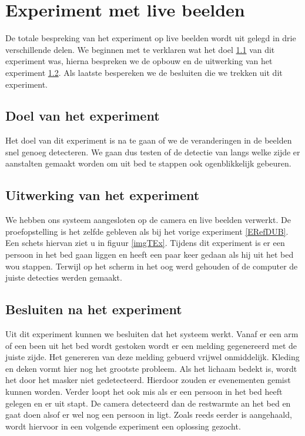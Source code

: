 \section{Experiment met live beelden}
\label{ERefELB}
De totale bespreking van het experiment op live beelden wordt uit gelegd in drie verschillende delen. We beginnen met te verklaren wat het doel \ref{ERefLBD} van dit experiment was, hierna bespreken we de opbouw en de uitwerking van het experiment \ref{ERefLBV}. Als laatste bespereken we de besluiten die we trekken uit dit experiment. 

\subsection{Doel van het experiment}
\label{ERefLBD}
Het doel van dit experiment is na te gaan of we de veranderingen in de beelden snel genoeg detecteren. We gaan dus testen of de detectie van langs welke zijde er aanstalten gemaakt worden om uit bed te stappen ook ogenblikkelijk gebeuren. 

\subsection{Uitwerking van het experiment}
\label{ERefLBV}
We  hebben ons systeem aangesloten op de camera en live beelden verwerkt. De proefopstelling is het zelfde gebleven als bij het vorige experiment \ref{ERefDUB}. Een schets hiervan ziet u in figuur \ref{imgTEx}. Tijdens dit experiment is er een persoon in het bed gaan liggen en heeft een paar keer gedaan als hij uit het bed wou stappen. Terwijl op het scherm in het oog werd gehouden of de computer de juiste detecties werden gemaakt.

\subsection{Besluiten na het experiment}
 Uit dit experiment kunnen we besluiten dat het systeem werkt. Vanaf er een arm of een been uit het bed wordt gestoken wordt er een melding gegenereerd met de juiste zijde. Het genereren van deze melding gebuerd vrijwel onmiddelijk. Kleding en deken vormt hier nog het grootste probleem. Als het lichaam bedekt is, wordt het door het masker niet gedetecteerd. Hierdoor zouden er evenementen gemist kunnen worden. Verder loopt het ook mis als er een persoon in het bed heeft gelegen en er uit stapt. De camera detecteerd dan de restwarmte an het bed en gaat doen alsof er wel nog een persoon in ligt. Zoals reeds eerder is aangehaald, wordt hiervoor in een volgende experiment een oplossing gezocht. 


